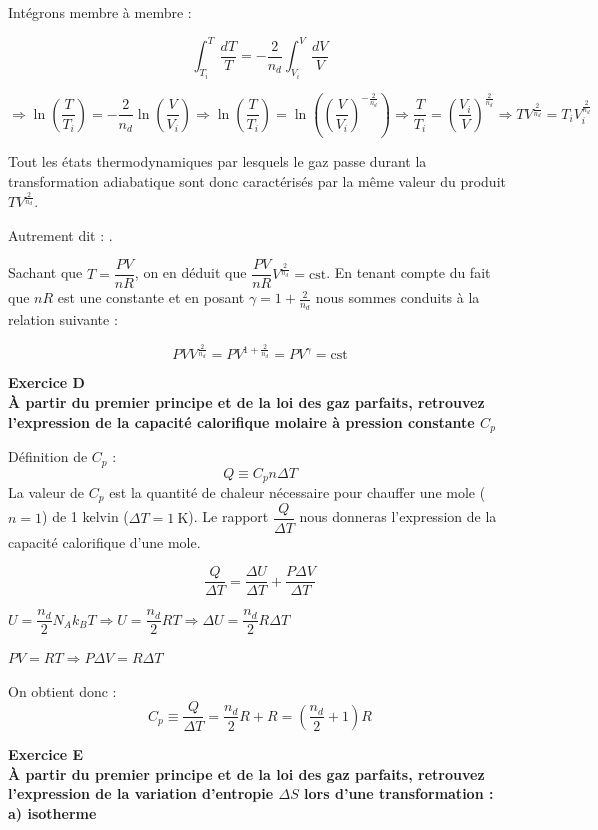 \documentclass	[11pt, a4paper, openany]{book}
\newcommand{\cst}{\text{cst}}
\newcommand{\exerc}[2]{\textbf{\Large Exercice #1\normalsize \\#2}}
\begin{document}
	Intégrons membre à membre :
	
	$$\int_{T_i}^{T} \frac{dT}{T} = -\frac{2}{n_d} \int_{V_i}^{V} \frac{dV}{V}$$
	
	$\Rightarrow \ln \left(\dfrac{T}{T_i}\right) = -\dfrac{2}{n_d} \ln \left(\dfrac{V}{V_i}\right) \Rightarrow \ln \left(\dfrac{T}{T_i}\right) =  \ln \left(\left(\dfrac{V}{V_i}\right)^{-\frac{2}{n_d}}\right) \Rightarrow \dfrac{T}{T_i} = \left(\dfrac{V_i}{V}\right)^{\frac{2}{n_d}} \Rightarrow TV^{\frac{2}{n_d}} = T_i V_i^{\frac{2}{n_d}}$
	
	Tout les états thermodynamiques par lesquels le gaz passe durant la transformation adiabatique sont donc caractérisés par la même valeur du produit $TV^{\frac{2}{n_d}}$.
	
	Autrement dit : \fbox{$TV^{\frac{2}{n_d}}=\cst$}.
	
	Sachant que $T = \dfrac{PV}{nR}$, on en déduit que $\dfrac{PV}{nR}V^{\frac{2}{n_d}} = \cst$. En tenant compte du fait que $nR$ est une constante et en posant $\gamma=1+\frac{2}{n_d}$ nous sommes conduits à la relation suivante :
	
	$$PV V^{\frac{2}{n_d}} = PV^{1+\frac{2}{n_d}}= PV^\gamma=\cst $$

\vspace{0,5cm}

\exerc{D}{À partir du premier principe et de la loi des gaz parfaits, retrouvez l’expression de la
capacité calorifique molaire à pression constante $C_p$}
	
	Définition de $C_p$ : $$Q \equiv C_p n \Delta T$$ La valeur de $C_p$ est la quantité de chaleur nécessaire pour chauffer une mole ($n=1$) de 1 kelvin ($\Delta T = 1\ \text{K}$). Le rapport $\dfrac{Q}{\Delta T}$ nous donneras l'expression de la capacité calorifique d'une mole.
	
	$$ \frac{Q}{\Delta T} = \frac{\Delta U}{\Delta T} + \frac{P\Delta V}{\Delta T}$$
	
	$U = \dfrac{n_d}{2}N_Ak_BT \Rightarrow U = \dfrac{n_d}{2}RT \Rightarrow \Delta U = \dfrac{n_d}{2}R\Delta T$
	
	$ PV = RT \Rightarrow P \Delta V = R \Delta T$
	
	On obtient donc : $$ C_p \equiv \frac{Q}{\Delta T} = \frac{n_d}{2}R + R = (\frac{n_d}{2}+1) R$$

\vspace{0,5cm}

\exerc{E}{À partir du premier principe et de la loi des gaz parfaits, retrouvez l’expression de la variation d'entropie $\Delta S$ lors d'une transformation : \\a) isotherme}
	
\end{document}
